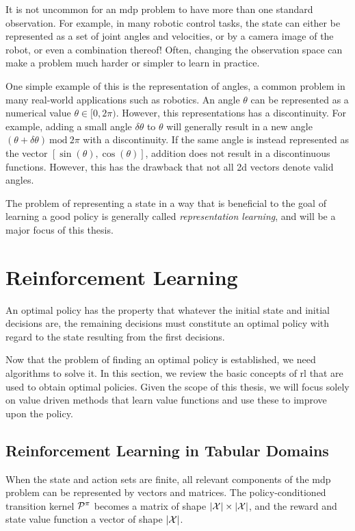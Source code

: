 It is not uncommon for an \ac{mdp} problem to have more than one standard observation.
For example, in many robotic control tasks, the state can either be represented as a set of joint angles and velocities, or by a camera image of the robot, or even a combination thereof!
Often, changing the observation space can make a problem much harder or simpler to learn in practice.

One simple example of this is the representation of angles, a common problem in many real-world applications such as robotics.
An angle $\theta$ can be represented as a numerical value $\theta \in [0,2\pi)$.
However, this representations has a discontinuity.
For example, adding a small angle $\delta\theta$ to $\theta$ will generally result in a new angle $(\theta + \delta\theta)~\mathrm{mod}~2\pi$ with a discontinuity.
If the same angle is instead represented as the vector $[\sin(\theta),\cos(\theta)]$, addition does not result in a discontinuous functions.
However, this has the drawback that not all 2d vectors denote valid angles.

The problem of representing a state in a way that is beneficial to the goal of learning a good policy is generally called \emph{representation learning}, and will be a major focus of this thesis.


\section{Reinforcement Learning}
\label{chap:background:rl}

\epigraph{An optimal policy has the property that whatever the initial state and initial decisions are, the remaining decisions must constitute an optimal policy with regard to the state resulting from the first decisions.}{\cite{bellman1953}}

Now that the problem of finding an optimal policy is established, we need algorithms to solve it.
In this section, we review the basic concepts of \ac{rl} that are used to obtain optimal policies.
Given the scope of this thesis, we will focus solely on value driven methods that learn value functions and use these to improve upon the policy.

\subsection{Reinforcement Learning in Tabular Domains}

When the state and action sets are finite, all relevant components of the \ac{mdp} problem can be represented by vectors and matrices.
The policy-conditioned transition kernel $\P^\pi$ becomes a matrix of shape $|\X| \times |\X|$, and the reward and state value function a vector of shape $|\X|$.


